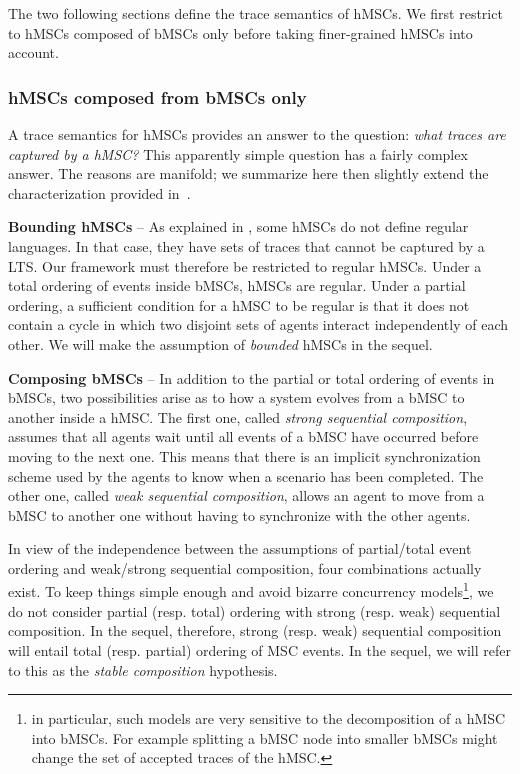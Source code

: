 The two following sections define the trace semantics of hMSCs. We first restrict to hMSCs composed of bMSCs only before taking finer-grained hMSCs into account. 

\subsubsection*{hMSCs composed from bMSCs only\label{subsubsection:hMSC-bMSC-only}}

A trace semantics for hMSCs provides an answer to the question: \emph{what traces are captured by a hMSC?} This apparently simple question has a fairly complex answer. The reasons are manifold; we summarize here then slightly extend the characterization provided in~\cite{Uchitel:2004}.

\noindent \textbf{Bounding hMSCs} -- As explained in \cite{Henriksen:2000}, some hMSCs do not define regular languages. In that case, they have sets of traces that cannot be captured by a LTS. Our framework must therefore be restricted to regular hMSCs. Under a total ordering of events inside bMSCs, hMSCs are regular. Under a partial ordering, a sufficient condition for a hMSC to be regular is that it does not contain a cycle in which two disjoint sets of agents interact independently of each other. We will make the assumption of \emph{bounded} hMSCs in the sequel.

\noindent \textbf{Composing bMSCs} -- In addition to the partial or total ordering of events in bMSCs, two possibilities arise as to how a system evolves from a bMSC to another inside a hMSC. The first one, called \emph{strong sequential composition}, assumes that all agents wait until all events of a bMSC have occurred before moving to the next one. This means that there is an implicit synchronization scheme used by the agents to know when a scenario has been completed. The other one, called \emph{weak sequential composition}, allows an agent to move from a bMSC to another one without having to synchronize with the other agents. 

In view of the independence between the assumptions of partial/total event ordering and weak/strong sequential composition, four combinations actually exist. To keep things simple enough and avoid bizarre concurrency models\footnote{in particular, such models are very sensitive to the decomposition of a hMSC into bMSCs. For example splitting a bMSC node into smaller bMSCs might change the set of accepted traces of the hMSC.}, we do not consider partial (resp. total) ordering with strong (resp. weak) sequential composition. In the sequel, therefore, strong (resp. weak) sequential composition will entail total (resp. partial) ordering of MSC events. In the sequel, we will refer to this as the \emph{stable composition} hypothesis. 


